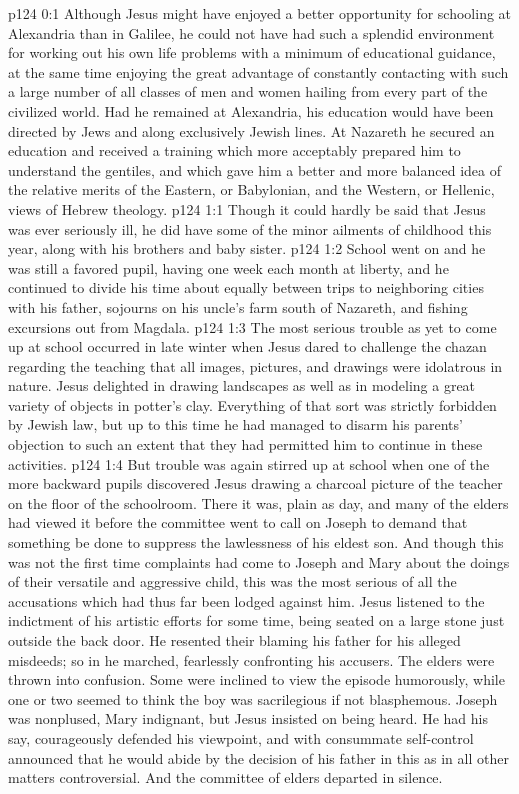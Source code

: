 \author{Midwayer Commission}
\vs p124 0:1 Although Jesus might have enjoyed a better opportunity for schooling at Alexandria than in Galilee, he could not have had such a splendid environment for working out his own life problems with a minimum of educational guidance, at the same time enjoying the great advantage of constantly contacting with such a large number of all classes of men and women hailing from every part of the civilized world. Had he remained at Alexandria, his education would have been directed by Jews and along exclusively Jewish lines. At Nazareth he secured an education and received a training which more acceptably prepared him to understand the gentiles, and which gave him a better and more balanced idea of the relative merits of the Eastern, or Babylonian, and the Western, or Hellenic, views of Hebrew theology.\plusone
{}
\vs p124 1:1 Though it could hardly be said that Jesus was ever seriously ill, he did have some of the minor ailments of childhood this year, along with his brothers and baby sister.
\vs p124 1:2 School went on and he was still a favored pupil, having one week each month at liberty, and he continued to divide his time about equally between trips to neighboring cities with his father, sojourns on his uncle’s farm south of Nazareth, and fishing excursions out from Magdala.
\pc \vs p124 1:3 The most serious trouble as yet to come up at school occurred in late winter when Jesus dared to challenge the chazan regarding the teaching that all images, pictures, and drawings were idolatrous in nature. Jesus delighted in drawing landscapes as well as in modeling a great variety of objects in potter’s clay. Everything of that sort was strictly forbidden by Jewish law, but up to this time he had managed to disarm his parents’ objection to such an extent that they had permitted him to continue in these activities.
\vs p124 1:4 But trouble was again stirred up at school when one of the more backward pupils discovered Jesus drawing a charcoal picture of the teacher on the floor of the schoolroom. There it was, plain as day, and many of the elders had viewed it before the committee went to call on Joseph to demand that something be done to suppress the lawlessness of his eldest son. And though this was not the first time complaints had come to Joseph and Mary about the doings of their versatile and aggressive child, this was the most serious of all the accusations which had thus far been lodged against him. Jesus listened to the indictment of his artistic efforts for some time, being seated on a large stone just outside the back door. He resented their blaming his father for his alleged misdeeds; so in he marched, fearlessly confronting his accusers. The elders were thrown into confusion. Some were inclined to view the episode humorously, while one or two seemed to think the boy was sacrilegious if not blasphemous. Joseph was nonplused, Mary indignant, but Jesus insisted on being heard. He had his say, courageously defended his viewpoint, and with consummate self\hyp{}control announced that he would abide by the decision of his father in this as in all other matters controversial. And the committee of elders departed in silence.
